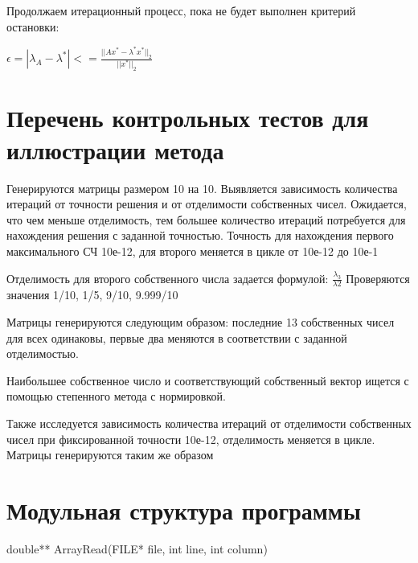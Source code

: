 Продолжаем итерационный процесс, пока не будет выполнен критерий остановки: 

\begin{math}
	\epsilon=|\lambda_{A}-\lambda^{*}|<=\frac{||Ax^{*}-\lambda^{*}x^{*}||_{2}}{||x^{*}||_{2}}
\end{math}

\section{Перечень контрольных тестов для иллюстрации метода}

Генерируются матрицы размером 10 на 10. Выявляется зависимость количества итераций от точности решения и от отделимости собственных чисел. Ожидается, что чем меньше отделимость, тем большее количество итераций потребуется для нахождения решения с заданной точностью. Точность для нахождения первого максимального СЧ 10е-12, для второго меняется в цикле от 10е-12 до 10е-1

Отделимость для второго собственного числа задается формулой:
\begin{math}
\frac{\lambda_{3}}{\lambda{2}}
\end{math}
Проверяются значения 1/10, 1/5, 9/10, 9.999/10

Матрицы генерируются следующим образом: последние 13 собственных чисел для всех одинаковы, первые два меняются в соответствии с заданной отделимостью.

Наибольшее собственное число и соответствующий собственный вектор ищется с помощью степенного метода с нормировкой.

Также исследуется зависимость количества итераций от отделимости собственных чисел при фиксированной точности 10е-12, отделимость меняется в цикле. Матрицы генерируются таким же образом

\section{Модульная структура программы}

double** ArrayRead(FILE* file, int line, int column)

